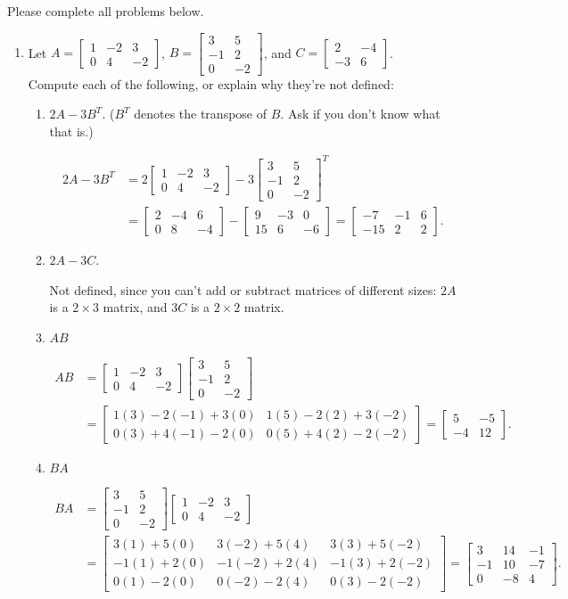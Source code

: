 \documentclass[12pt]{article}
\newcommand{\di}{\displaystyle}
\newcommand{\bbm}{\begin{bmatrix}}
\newcommand{\ebm}{\end{bmatrix}}
\begin{document}
\thispagestyle{fancy}
Please complete all problems below.
 \begin{enumerate}
 \item Let $A=\di \bbm 1&-2&3\\0&4&-2\ebm$, $B=\di \bbm 3&5\\-1&2\\0&-2\ebm$, and $C=\di \bbm 2&-4\\-3&6\ebm$.\\ Compute each of the following, or explain why they're not defined:
\begin{enumerate}
 \item $2A-3B^T$. ($B^T$ denotes the transpose of $B$. Ask if you don't know what that is.)

\begin{align*}
 2A-3B^T & = 2\bbm 1&-2&3\\0&4&-2\ebm-3\bbm 3&5\\-1&2\\0&-2\ebm^T\\
& = \bbm 2&-4&6\\0&8&-4\ebm-\bbm 9&-3&0\\15&6&-6\ebm = \bbm -7&-1&6\\-15&2&2\ebm.
\end{align*}


 \item $2A-3C$.

\bigskip

Not defined, since you can't add or subtract matrices of different sizes: $2A$ is a $2\times 3$ matrix, and $3C$ is a $2\times 2$ matrix.

\medskip

 \item $AB$

\begin{align*}
 AB & = \bbm 1&-2&3\\0&4&-2\ebm \bbm 3&5\\-1&2\\0&-2\ebm\\
 & = \bbm 1(3)-2(-1)+3(0) & 1(5)-2(2)+3(-2)\\0(3)+4(-1)-2(0)& 0(5)+4(2)-2(-2)\ebm = \bbm 5&-5\\-4&12\ebm.
\end{align*}



 \item $BA$

\begin{align*}
 BA & = \bbm 3&5\\-1&2\\0&-2\ebm \bbm 1&-2&3\\0&4&-2\ebm\\
& = \bbm 3(1)+5(0)&3(-2)+5(4)&3(3)+5(-2)\\
-1(1)+2(0)&-1(-2)+2(4)&-1(3)+2(-2)\\
0(1)-2(0)&0(-2)-2(4)&0(3)-2(-2)\ebm = \bbm 3& 14 & -1\\-1&10&-7\\0&-8&4\ebm.
\end{align*}




\end{enumerate}
\end{enumerate}
\end{document}
